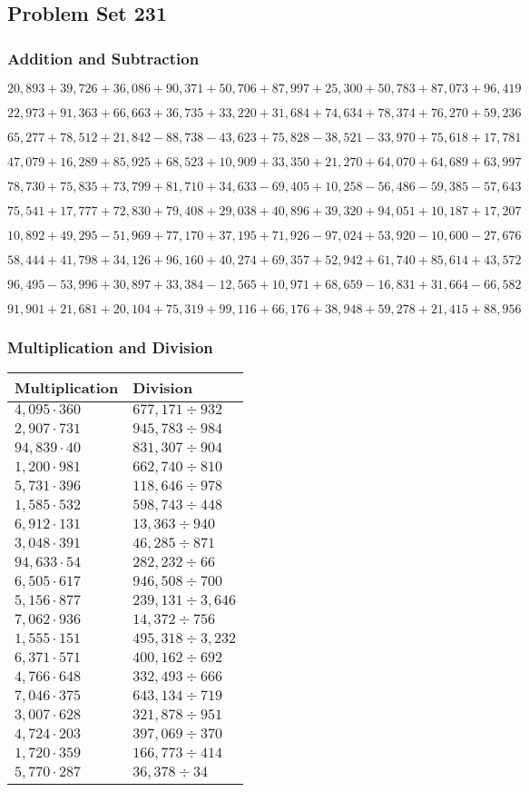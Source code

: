 \hypertarget{problem-set-231}{%
\subsection{Problem Set 231}\label{problem-set-231}}

\hypertarget{addition-and-subtraction}{%
\subsubsection{Addition and
Subtraction}\label{addition-and-subtraction}}

\(20,893+39,726+36,086+90,371+50,706+87,997+25,300+50,783+87,073+96,419\)

\(22,973+91,363+66,663+36,735+33,220+31,684+74,634+78,374+76,270+59,236\)

\(65,277+78,512+21,842-88,738-43,623+75,828-38,521-33,970+75,618+17,781\)

\(47,079+16,289+85,925+68,523+10,909+33,350+21,270+64,070+64,689+63,997\)

\(78,730+75,835+73,799+81,710+34,633-69,405+10,258-56,486-59,385-57,643\)

\(75,541+17,777+72,830+79,408+29,038+40,896+39,320+94,051+10,187+17,207\)

\(10,892+49,295-51,969+77,170+37,195+71,926-97,024+53,920-10,600-27,676\)

\(58,444+41,798+34,126+96,160+40,274+69,357+52,942+61,740+85,614+43,572\)

\(96,495-53,996+30,897+33,384-12,565+10,971+68,659-16,831+31,664-66,582\)

\(91,901+21,681+20,104+75,319+99,116+66,176+38,948+59,278+21,415+88,956\)

\hypertarget{multiplication-and-division}{%
\subsubsection{Multiplication and
Division}\label{multiplication-and-division}}

\begin{longtable}[]{@{}ll@{}}
\toprule
Multiplication & Division\tabularnewline
\midrule
\endhead
\(4,095\cdot360\) & \(677,171÷932\)\tabularnewline
\(2,907\cdot731\) & \(945,783÷984\)\tabularnewline
\(94,839\cdot40\) & \(831,307÷904\)\tabularnewline
\(1,200\cdot981\) & \(662,740÷810\)\tabularnewline
\(5,731\cdot396\) & \(118,646÷978\)\tabularnewline
\(1,585\cdot532\) & \(598,743÷448\)\tabularnewline
\(6,912\cdot131\) & \(13,363÷940\)\tabularnewline
\(3,048\cdot391\) & \(46,285÷871\)\tabularnewline
\(94,633\cdot54\) & \(282,232÷66\)\tabularnewline
\(6,505\cdot617\) & \(946,508÷700\)\tabularnewline
\(5,156\cdot877\) & \(239,131÷3,646\)\tabularnewline
\(7,062\cdot936\) & \(14,372÷756\)\tabularnewline
\(1,555\cdot151\) & \(495,318÷3,232\)\tabularnewline
\(6,371\cdot571\) & \(400,162÷692\)\tabularnewline
\(4,766\cdot648\) & \(332,493÷666\)\tabularnewline
\(7,046\cdot375\) & \(643,134÷719\)\tabularnewline
\(3,007\cdot628\) & \(321,878÷951\)\tabularnewline
\(4,724\cdot203\) & \(397,069÷370\)\tabularnewline
\(1,720\cdot359\) & \(166,773÷414\)\tabularnewline
\(5,770\cdot287\) & \(36,378÷34\)\tabularnewline
\bottomrule
\end{longtable}
